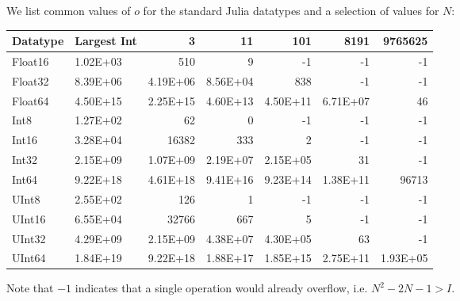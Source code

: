 We list common values of $o$ for the standard Julia datatypes and a selection of values for $N$:

\begin{center}
\begin{tabular}{llrrrrr}
\hline
\textbf{Datatype} & \multicolumn{1}{l}{\textbf{Largest Int}} & \textbf{3} & \textbf{11} & \textbf{101} & \textbf{8191} & \textbf{9765625} \\ \hline
Float16           & 1.02E+03                                     & 510        & 9           & -1           & -1            & -1               \\
Float32           & 8.39E+06                                     & 4.19E+06   & 8.56E+04    & 838          & -1            & -1               \\
Float64           & 4.50E+15                                     & 2.25E+15   & 4.60E+13    & 4.50E+11     & 6.71E+07      & 46               \\
Int8              & 1.27E+02                                     & 62         & 0           & -1           & -1            & -1               \\
Int16             & 3.28E+04                                     & 16382      & 333         & 2            & -1            & -1               \\
Int32             & 2.15E+09                                     & 1.07E+09   & 2.19E+07    & 2.15E+05     & 31            & -1               \\
Int64             & 9.22E+18                                     & 4.61E+18   & 9.41E+16    & 9.23E+14     & 1.38E+11      & 96713            \\
UInt8             & 2.55E+02                                     & 126        & 1           & -1           & -1            & -1               \\
UInt16            & 6.55E+04                                     & 32766      & 667         & 5            & -1            & -1               \\
UInt32            & 4.29E+09                                     & 2.15E+09   & 4.38E+07    & 4.30E+05     & 63            & -1               \\
UInt64            & 1.84E+19                                     & 9.22E+18   & 1.88E+17    & 1.85E+15     & 2.75E+11      & 1.93E+05         \\ \hline
\end{tabular}
\end{center}
%
Note that $-1$ indicates that a single operation would already overflow, i.e. $N^2 - 2N - 1 > I$.


